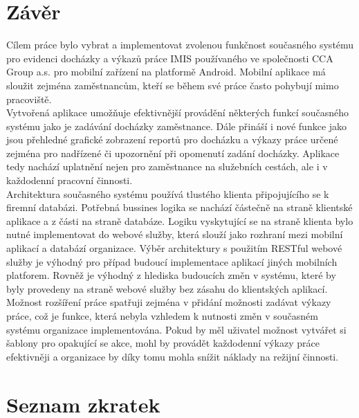 \documentclass{diplomka}
\begin{document}
\chapter{Závěr}
Cílem práce bylo vybrat a implementovat zvolenou funkčnost současného systému pro evidenci docházky a výkazů práce IMIS používaného ve společnosti CCA Group a.s. pro mobilní zařízení na platformě Android. Mobilní aplikace má sloužit zejména zaměstnancům, kteří se během své práce často pohybují mimo pracoviště.
\\ \indent
Vytvořená aplikace umožňuje efektivnější provádění některých funkcí současného systému jako je zadávání docházky zaměstnance. Dále přináší i nové funkce jako jsou přehledné grafické zobrazení reportů pro docházku a výkazy práce určené zejména pro nadřízené či upozornění při opomenutí zadání docházky. Aplikace tedy nachází uplatnění nejen pro zaměstnance na služebních cestách, ale i v každodenní pracovní činnosti.
\\ \indent
Architektura současného systému používá tlustého klienta připojujícího se k firemní databázi. Potřebná bussines logika se nachází částečně na straně klientské aplikace a z části na straně databáze. Logiku vyskytující se na straně klienta bylo nutné implementovat do webové služby, která slouží jako rozhraní mezi mobilní aplikací a databází organizace. Výběr architektury s použitím RESTful webové služby je výhodný pro případ budoucí implementace aplikací jiných mobilních platforem. Rovněž je výhodný z hlediska budoucích změn v systému, které by byly provedeny na straně webové služby bez zásahu do klientských aplikací.
\\ \indent
Možnost rozšíření práce spatřuji zejména v přidání možnosti zadávat výkazy práce, což je funkce, která nebyla vzhledem k nutnosti změn v současném systému organizace implementována. Pokud by měl uživatel možnost vytvářet si šablony pro opakující se akce, mohl by provádět každodenní výkazy práce efektivněji a organizace by díky tomu mohla snížit náklady na režijní činnosti.

\chapter*{Seznam zkratek} 
\end{document}
